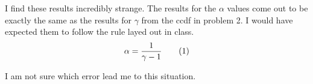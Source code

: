 I find these results incredibly strange. The results for the $\alpha$ values come out to be exactly the same as the results for $\gamma$ from the ccdf in problem 2. I would have expected them to follow the rule layed out in class.
\[
    \alpha =
    \frac{1}{\gamma - 1}
    \addtag
\]

I am not sure which error lead me to this situation. 